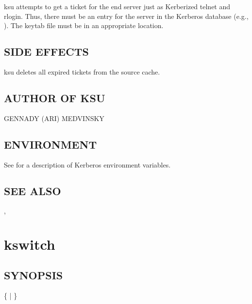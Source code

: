 \documentclass[letterpaper,10pt,english]{sphinxmanual}
\begin{document}
\sphinxAtStartPar
ksu attempts to get a ticket for the end server just as Kerberized
telnet and rlogin.  Thus, there must be an entry for the server in the
Kerberos database (e.g., ).  The keytab
file must be in an appropriate location.


\subsection{SIDE EFFECTS}
\label{\detokenize{user/user_commands/ksu:side-effects}}
\sphinxAtStartPar
ksu deletes all expired tickets from the source cache.


\subsection{AUTHOR OF KSU}
\label{\detokenize{user/user_commands/ksu:author-of-ksu}}
\sphinxAtStartPar
GENNADY (ARI) MEDVINSKY


\subsection{ENVIRONMENT}
\label{\detokenize{user/user_commands/ksu:environment}}
\sphinxAtStartPar
See {\hyperref[\detokenize{user/user_config/kerberos:kerberos-7}]{}} for a description of Kerberos environment
variables.


\subsection{SEE ALSO}
\label{\detokenize{user/user_commands/ksu:see-also}}
\sphinxAtStartPar
{\hyperref[\detokenize{user/user_config/kerberos:kerberos-7}]{}}, {\hyperref[\detokenize{user/user_commands/kinit:kinit-1}]{}}

\sphinxstepscope


\section{kswitch}
\label{\detokenize{user/user_commands/kswitch:kswitch}}\label{\detokenize{user/user_commands/kswitch:kswitch-1}}\label{\detokenize{user/user_commands/kswitch::doc}}

\subsection{SYNOPSIS}
\label{\detokenize{user/user_commands/kswitch:synopsis}}
\sphinxAtStartPar
{}
\{ | \}
\end{document}
